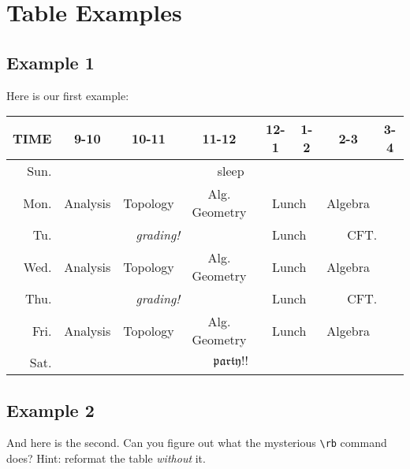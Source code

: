 \documentclass[10pt]{amsart}
\begin{document}
\section{Table Examples}

\subsection{Example 1}

Here is our first example:
\bigskip
\renewcommand{\arraystretch}{1.5}

\begin{tabular}{|r||c|c|c|c|c|c|c|}
    \hline
    {\bf TIME} & 9-10 & 10-11 & 11-12 & 12-1 & 1-2 & 2-3 & 3-4 \\
    \hline
    \hline
    {\sc Sun.} & \multicolumn{7}{c|}{sleep}\\
    \hline
    {\sc Mon.} & Analysis & Topology & Alg. Geometry & \multicolumn{2}{c|}{Lunch} & Algebra & \\
    \hline
    {\sc Tu.}  &  \multicolumn{3}{c|}{\em grading!}  & \multicolumn{2}{c|}{Lunch} &   \multicolumn{2}{c|}{CFT.} \\
    \hline
    {\sc Wed.} & Analysis & Topology & Alg. Geometry & \multicolumn{2}{c|}{Lunch} & Algebra & \\
    \hline
    {\sc Thu.} &  \multicolumn{3}{c|}{\em grading!}  & \multicolumn{2}{c|}{Lunch} &   \multicolumn{2}{c|}{CFT.} \\
    \hline
    {\sc Fri.} & Analysis & Topology & Alg. Geometry & \multicolumn{2}{c|}{Lunch} & Algebra & \\
    \hline
    {\sc Sat.} & \multicolumn{7}{c|}{$\mathfrak{party!!}$} \\
    \hline
\end{tabular}

\subsection{Example 2}

And here is the second.  Can you figure out what the mysterious \verb=\rb= command does?  Hint: reformat the table {\em without} it.

\bigskip
\renewcommand{\arraystretch}{1.3}
\newcommand{\rb}[1]{\raisebox{1.5ex}[0pt]{#1}}
\end{document}
